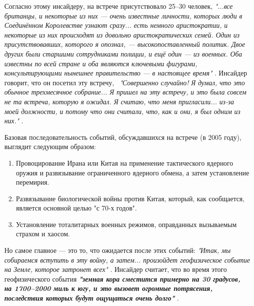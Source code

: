 \documentclass[10pt,twocolumn,letterpaper]{article}
\begin{document}
Согласно этому инсайдеру, на встрече присутствовало 25–30 человек, \textit{"...все британцы, и некоторые из них — очень известные личности, которых люди в Соединённом Королевстве узнают сразу... есть немного аристократии, и некоторые из них происходят из довольно аристократических семей. Один из присутствовавших, которого я опознал, — высокопоставленный политик. Двое других были старшими сотрудниками полиции, и ещё один — из военных. Оба известны по всей стране и оба являются ключевыми фигурами, консультирующими нынешнее правительство — в настоящее время"} \cite{4}. Инсайдер говорит, что он посетил эту встречу, \ \textit{"Совершенно случайно! Я думал, что это обычное трехмесячное собрание... Я пришел на эту встречу, и это была совсем не та встреча, которую я ожидал. Я считаю, что меня пригласили... из-за моей должности, и потому что они считали, что, как и они, я был одним из них."} \cite{4}.

Базовая последовательность событий, обсуждавшихся на встрече (в 2005 году), выглядит следующим образом:
\begin{flushleft}
\begin{enumerate}
    \item Провоцирование Ирана или Китая на применение тактического ядерного оружия и развязывание ограниченного ядерного обмена, а затем установление перемирия.
    \item Развязывание биологической войны против Китая, который, как сообщается, является основной целью "с 70-х годов".
    \item Установление тоталитарных военных режимов, оправданных вызываемым страхом и хаосом.
\end{enumerate}
\end{flushleft}

Но самое главное — это то, что ожидается после этих событий: \textit{"Итак, мы собираемся вступить в эту войну, а затем... произойдет геофизическое событие на Земле, которое затронет всех"} \cite{4}. Инсайдер считает, что во время этого геофизического события \textit{\textbf{"земная кора сместится примерно на 30 градусов, на 1700–2000 миль к югу, и это вызовет огромные потрясения, последствия которых будут ощущаться очень долго"}} \cite{4}.
\end{document}
